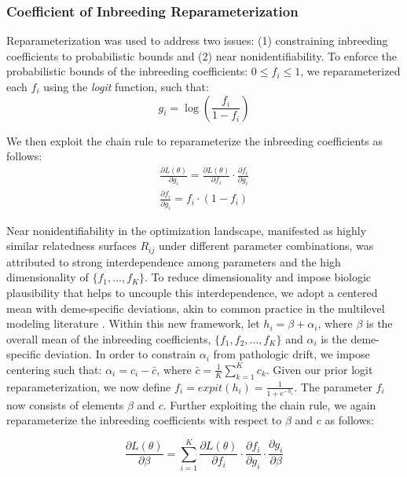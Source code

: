 \documentclass[a4paper, 12pt]{article}
\begin{document}
\subsubsection{Coefficient of Inbreeding Reparameterization}
Reparameterization was used to address two issues: (1) constraining inbreeding coefficients to probabilistic bounds and (2) near nonidentifiability. To enforce the probabilistic bounds of the inbreeding coefficients:  $0 \leq f_i \leq 1$, we reparameterized each $f_i$ using the \textit{logit} function, such that:
\begin{equation}
    g_i = \log\left( \frac{f_i}{1-f_i} \right)
\end{equation}

\noindent We then exploit the chain rule to reparameterize the inbreeding coefficients as follows:
\begin{align}
    \label{eq_loss_figi_reparam}
    \frac{\partial L(\theta)}{\partial g_i} =  \frac{\partial L(\theta)}{\partial f_i} \cdot \frac{\partial f_i}{\partial g_i} \\
    \frac{\partial f_i}{\partial g_i} = f_i \cdot (1-f_i)
\end{align}

\noindent Near nonidentifiability in the optimization landscape, manifested as highly similar relatedness surfaces $R_{ij}$ under different parameter combinations, was attributed to strong interdependence among parameters and the high dimensionality of $\{f_1,\dots,f_K\}$. To reduce dimensionality and impose biologic plausibility that helps to uncouple this interdependence, we adopt a centered mean with deme-specific deviations, akin to common practice in the multilevel modeling literature \cite{gelmanhill2007}. Within this new framework, let $h_i = \beta + \alpha_i$, where $\beta$ is the overall mean of the inbreeding coefficients, $\{f_1, f_2, \dots, f_K\}$ and $\alpha_i$ is the deme-specific deviation. In order to constrain $\alpha_i$ from pathologic drift, we impose centering such that: $\alpha_i = c_i - \bar{c}$, where $\bar{c} = \frac{1}{K} \sum_{k=1}^K c_k$.
Given our prior logit reparameterization, we now define $f_i = \textit{expit}(h_i) = \frac{1}{1 + e^{-h_i}}$. The parameter $f_i$ now consists of elements $\beta$ and $c$. Further exploiting the chain rule, we again reparameterize the inbreeding coefficients with respect to $\beta$ and $c$ as follows:


\begin{equation}
    \label{eq_loss_figibeta_reparam}
    \frac{\partial L(\theta)}{\partial \beta} =  \sum_{i=1}^K  \frac{\partial L(\theta)}{\partial f_i} \cdot \frac{\partial f_i}{\partial g_i} \cdot
    \frac{\partial g_i}{\partial \beta}
\end{equation}
\end{document}
